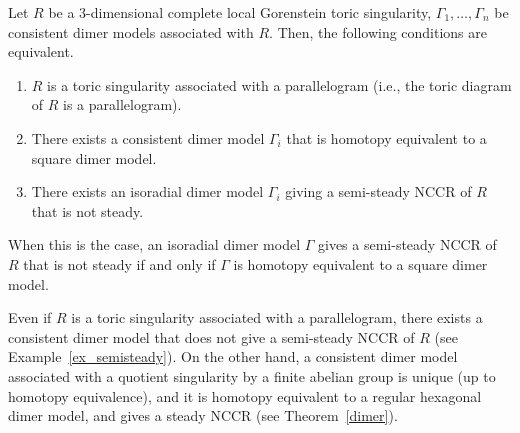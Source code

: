 \begin{theo}\label{main_thm}
Let $R$ be a $3$-dimensional complete local Gorenstein toric singularity, $\Gamma_1,\dots,\Gamma_n$ be consistent dimer models associated with $R$. Then, the following conditions are equivalent.
\begin{enumerate}%
\item\label{th4-2_1} $R$ is a toric singularity associated with a parallelogram (i.e., the toric diagram of $R$ is a parallelogram).
\item\label{th4-2_2} There exists a consistent dimer model $\Gamma_i$ that is homotopy equivalent to a square dimer model.
\item\label{th4-2_3} There exists an isoradial dimer model $\Gamma_i$ giving a semi-steady NCCR of $R$ that is not steady.
\end{enumerate}
When this is the case, an isoradial dimer model $\Gamma$ gives a semi-steady NCCR of $R$ that is not steady if and only if $\Gamma$ is homotopy equivalent to a square dimer model.
\end{theo}

\begin{rema}
Even if $R$ is a toric singularity associated with a parallelogram, there exists a consistent dimer model that does not give a semi-steady NCCR of $R$ (see Example~\ref{ex_semisteady}). On the other hand, a consistent dimer model associated with a quotient singularity by a finite abelian group is unique (up to homotopy equivalence), and it is homotopy equivalent to a regular hexagonal dimer model, and gives a steady NCCR (see Theorem~\ref{dimer}).
\end{rema}

